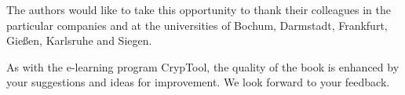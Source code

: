 The authors would like to take this opportunity to thank their colleagues 
in the particular companies and at the universities of Bochum, Darmstadt,
Frankfurt, Gie\ss en, Karlsruhe and Siegen.

\enlargethispage{12pt}
As with the e-learning program CrypTool, the quality of the 
book is enhanced by your suggestions and ideas for improvement. 
We look forward to your feedback.


